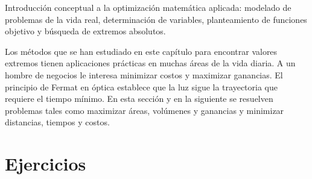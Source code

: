 
Introducción conceptual a la optimización matemática aplicada: modelado de problemas de la vida real, determinación de variables, planteamiento de funciones objetivo y búsqueda de extremos absolutos.

Los métodos que se han estudiado en este capítulo para encontrar valores extremos tienen aplicaciones prácticas en muchas áreas de la vida diaria. A un hombre de negocios le interesa minimizar costos y maximizar ganancias. El principio de Fermat en óptica establece que la luz sigue la trayectoria que requiere el tiempo mínimo. En esta sección y en la siguiente se resuelven problemas tales como maximizar áreas, volúmenes y ganancias y minimizar distancias, tiempos y costos.

\vspace{1.5em}
\section*{Ejercicios}

